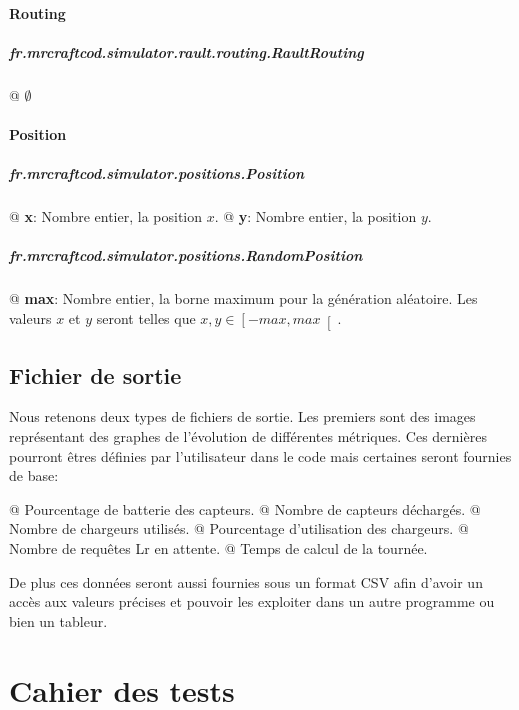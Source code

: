 \documentclass[noposter,final]{polytech/polytech}
\begin{document}
			\subsubsection{Routing}
				\paragraph{fr.mrcraftcod.simulator.rault.routing.RaultRouting}
					\begin{easylist}[itemize]
						@ $\emptyset$
					\end{easylist}
					
			\subsubsection{Position\label{sec:jsonconf:pos}}
				\paragraph{fr.mrcraftcod.simulator.positions.Position}
					\begin{easylist}[itemize]
						@ \textbf{x}: Nombre entier, la position $x$.
						@ \textbf{y}: Nombre entier, la position $y$.
					\end{easylist}
					
				\paragraph{fr.mrcraftcod.simulator.positions.RandomPosition}
					\begin{easylist}[itemize]
						@ \textbf{max}: Nombre entier, la borne maximum pour la génération aléatoire. Les valeurs $x$ et $y$ seront telles que $x,y\in\left[-max, max\right[$.
					\end{easylist}

	\section{Fichier de sortie\label{sec:csvoutput}}
		Nous retenons deux types de fichiers de sortie.
		Les premiers sont des images représentant des graphes de l'évolution de différentes métriques. Ces dernières pourront êtres définies par l'utilisateur dans le code mais certaines seront fournies de base:
		\begin{easylist}[itemize]
			@ Pourcentage de batterie des capteurs.
			@ Nombre de capteurs déchargés.
			@ Nombre de chargeurs utilisés.
			@ Pourcentage d'utilisation des chargeurs.
			@ Nombre de requêtes Lr en attente.
			@ Temps de calcul de la tournée.
		\end{easylist}
		
		De plus ces données seront aussi fournies sous un format CSV afin d'avoir un accès aux valeurs précises et pouvoir les exploiter dans un autre programme ou bien un tableur.


\chapter{Cahier des tests}
\end{document}
